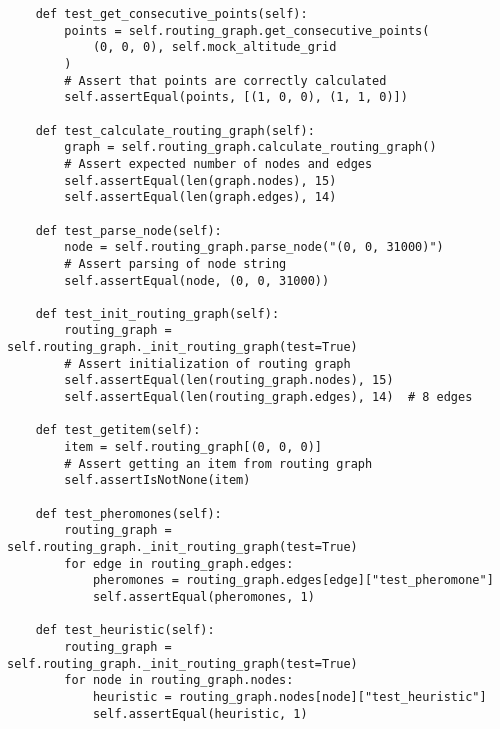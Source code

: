 \begin{verbatim}
    def test_get_consecutive_points(self):
        points = self.routing_graph.get_consecutive_points(
            (0, 0, 0), self.mock_altitude_grid
        )
        # Assert that points are correctly calculated
        self.assertEqual(points, [(1, 0, 0), (1, 1, 0)])

    def test_calculate_routing_graph(self):
        graph = self.routing_graph.calculate_routing_graph()
        # Assert expected number of nodes and edges
        self.assertEqual(len(graph.nodes), 15)
        self.assertEqual(len(graph.edges), 14)

    def test_parse_node(self):
        node = self.routing_graph.parse_node("(0, 0, 31000)")
        # Assert parsing of node string
        self.assertEqual(node, (0, 0, 31000))

    def test_init_routing_graph(self):
        routing_graph = self.routing_graph._init_routing_graph(test=True)
        # Assert initialization of routing graph
        self.assertEqual(len(routing_graph.nodes), 15)
        self.assertEqual(len(routing_graph.edges), 14)  # 8 edges

    def test_getitem(self):
        item = self.routing_graph[(0, 0, 0)]
        # Assert getting an item from routing graph
        self.assertIsNotNone(item)

    def test_pheromones(self):
        routing_graph = self.routing_graph._init_routing_graph(test=True)
        for edge in routing_graph.edges:
            pheromones = routing_graph.edges[edge]["test_pheromone"]
            self.assertEqual(pheromones, 1)

    def test_heuristic(self):
        routing_graph = self.routing_graph._init_routing_graph(test=True)
        for node in routing_graph.nodes:
            heuristic = routing_graph.nodes[node]["test_heuristic"]
            self.assertEqual(heuristic, 1)

\end{verbatim}
